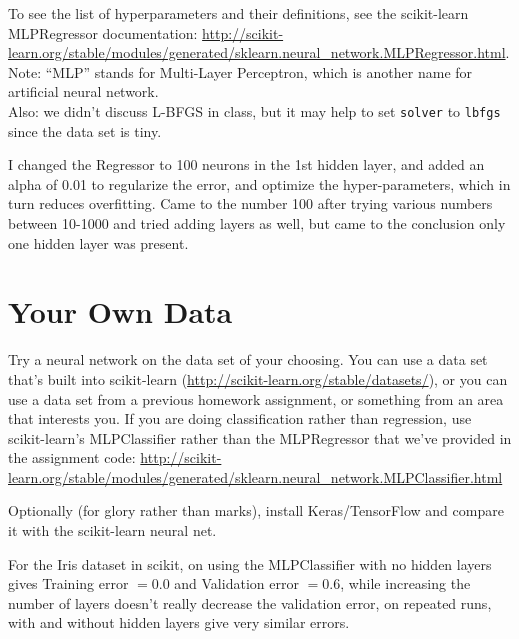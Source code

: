\documentclass{article}
\begin{document}
To see the list of hyperparameters and their definitions, see the scikit-learn MLPRegressor documentation:
\url{http://scikit-learn.org/stable/modules/generated/sklearn.neural_network.MLPRegressor.html}. Note: ``MLP'' stands for Multi-Layer Perceptron, 
which is another name for artificial neural network.\\
Also: we didn't discuss L-BFGS in class, but it may help to set \verb|solver| to \verb|lbfgs| since the data set is tiny.

I changed the Regressor to 100 neurons in the 1st hidden layer, and added an alpha of 0.01 to regularize the error, and optimize the hyper-parameters, which in turn reduces overfitting. Came to the number 100 after trying various numbers between 10-1000 and tried adding layers as well, but came to the conclusion only one hidden layer was present.


\section{Your Own Data}

Try a neural network on the data set of your choosing. 
You can use a data set that's built into scikit-learn
(\url{http://scikit-learn.org/stable/datasets/}), or you can use a data set from a previous homework assignment, or something from an area that interests you. 
If you are doing classification rather than regression, use scikit-learn's MLPClassifier rather than the MLPRegressor that we've provided in the assignment code: \url{http://scikit-learn.org/stable/modules/generated/sklearn.neural_network.MLPClassifier.html}


 Optionally (for glory rather than marks), install Keras/TensorFlow and compare it with
the scikit-learn neural net.

For the Iris dataset in scikit, on using the MLPClassifier with no hidden layers gives Training error $=  0.0$ and Validation error $=  0.6$, while increasing the number of layers doesn't really decrease the validation error, on repeated runs, with and without hidden layers give very similar errors.
\end{document}
